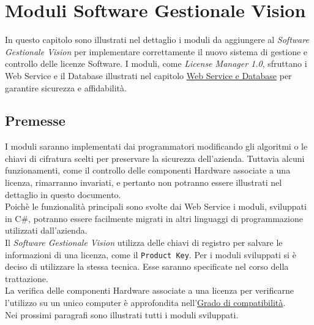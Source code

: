 
\chapter{Moduli Software Gestionale Vision}
\label{cap:moduli-vision}
In questo capitolo sono illustrati nel dettaglio i moduli da aggiungere al \textit{Software Gestionale Vision} per implementare correttamente il nuovo sistema di gestione e controllo delle licenze Software. I moduli, come \textit{License Manager 1.0}, sfruttano i Web Service e il Database illustrati nel capitolo {\hyperref[cap:sviluppo-software]{Web Service e Database}} per garantire sicurezza e affidabilità. 


\section{Premesse}
I moduli saranno implementati dai programmatori modificando gli algoritmi o le chiavi di cifratura scelti per preservare la sicurezza dell'azienda. Tuttavia alcuni funzionamenti, come il controllo delle componenti Hardware associate a una licenza, rimarranno invariati, e pertanto non potranno essere illustrati nel dettaglio in questo documento.
\\Poichè le funzionalità principali sono svolte dai Web Service i moduli, sviluppati in C\#, potranno essere facilmente migrati in altri linguaggi di programmazione utilizzati dall'azienda.
\\
Il \textit{Software Gestionale Vision} utilizza delle chiavi di registro per salvare le informazioni di una licenza, come il \texttt{Product Key}. Per i moduli sviluppati si è deciso di utilizzare la stessa tecnica. Esse saranno specificate nel corso della trattazione. 
\\La verifica delle componenti Hardware associate a una licenza per verificarne l'utilizzo su un unico computer è approfondita nell'{\hyperref[cap:appA]{Grado di compatibilità}}.  
\\Nei prossimi paragrafi sono illustrati tutti i moduli sviluppati.

\newpage
